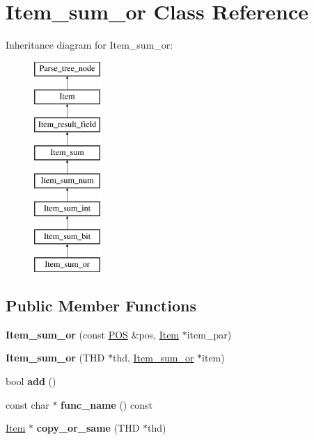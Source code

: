 \hypertarget{classItem__sum__or}{}\section{Item\+\_\+sum\+\_\+or Class Reference}
\label{classItem__sum__or}
Inheritance diagram for Item\+\_\+sum\+\_\+or\+:\begin{figure}[H]
\begin{center}
\leavevmode
\includegraphics[height=8.000000cm]{classItem__sum__or}
\end{center}
\end{figure}
\subsection*{Public Member Functions}
\begin{DoxyCompactItemize}
\item 
\mbox{\label{classItem__sum__or_aaade88097966fea163921d88ffc37077}} 
{\bfseries Item\+\_\+sum\+\_\+or} (const \mbox{\hyperlink{structYYLTYPE}{P\+OS}} \&pos, \mbox{\hyperlink{classItem}{Item}} $\ast$item\+\_\+par)
\item 
\mbox{\label{classItem__sum__or_ab1092dd372dc9d8a67bc03c8d6d060a6}} 
{\bfseries Item\+\_\+sum\+\_\+or} (T\+HD $\ast$thd, \mbox{\hyperlink{classItem__sum__or}{Item\+\_\+sum\+\_\+or}} $\ast$item)
\item 
\mbox{\label{classItem__sum__or_adcf492d003db6a7ea41264403f2789f6}} 
bool {\bfseries add} ()
\item 
\mbox{\label{classItem__sum__or_a8bb2cb33de4e4414ca7edbfcd61580be}} 
const char $\ast$ {\bfseries func\+\_\+name} () const
\item 
\mbox{\label{classItem__sum__or_a51506bee2602ebad465575ef79aee39a}} 
\mbox{\hyperlink{classItem}{Item}} $\ast$ {\bfseries copy\+\_\+or\+\_\+same} (T\+HD $\ast$thd)
\end{DoxyCompactItemize}
